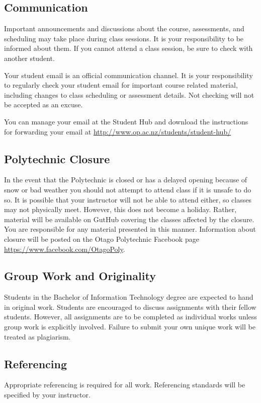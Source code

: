 \documentclass{article}
\begin{document}
\subsection*{Communication}
Important announcements and discussions about the course, assessments, and scheduling may take place during class sessions.  It is your responsibility to be informed about them.  If you cannot attend a class session, be sure to check with another student.

Your student email is an official communication channel. It is your responsibility to regularly check your student email for important course related material, including changes to class scheduling or assessment details. Not checking will not be accepted as an excuse.

You can manage your email at the Student Hub and download the instructions for forwarding your email at \url{http://www.op.ac.nz/students/student-hub/}

\subsection*{Polytechnic Closure}
In the event that the Polytechnic is closed or has a delayed opening because of snow or bad weather you should not attempt to attend class if it is unsafe to do so. It is possible that your instructor will not be able to attend either, so classes may not physically meet. However, this does not become a holiday. Rather, material will be available on GutHub covering the classes affected by the closure. You are responsible for any material presented in this manner. Information about closure will be posted on the Otago Polytechnic Facebook page \url{https://www.facebook.com/OtagoPoly}.

\subsection*{Group Work and Originality}
Students in the Bachelor of Information Technology degree are expected to hand in original work.  Students are encouraged to discuss
assignments with their fellow students.  However, all assignments are to be completed as individual works unless group work is explicitly involved.
Failure to submit your own unique work will be treated as plagiarism.

\subsection*{Referencing}
Appropriate referencing is required for all work.  Referencing standards will be specified by your instructor.
\end{document}
